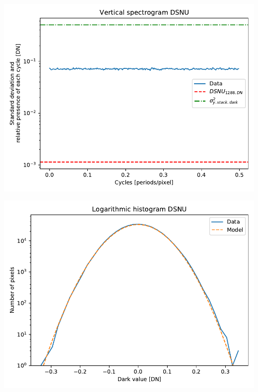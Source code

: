 \documentclass[a4paper,twoside,12pt,american,hidelinks]{article}
\begin{document}
\begin{center}
\includegraphics[height=0.45\textheight,keepaspectratio]{OP1/PlotVerticalSpectrogramDSNU.pdf}
\end{center}
\vfill
\newpage
\begin{center}
\includegraphics[height=0.45\textheight,keepaspectratio]{OP1/PlotLogarithmicHistogramDSNU.pdf}
\end{center}
\end{document}

